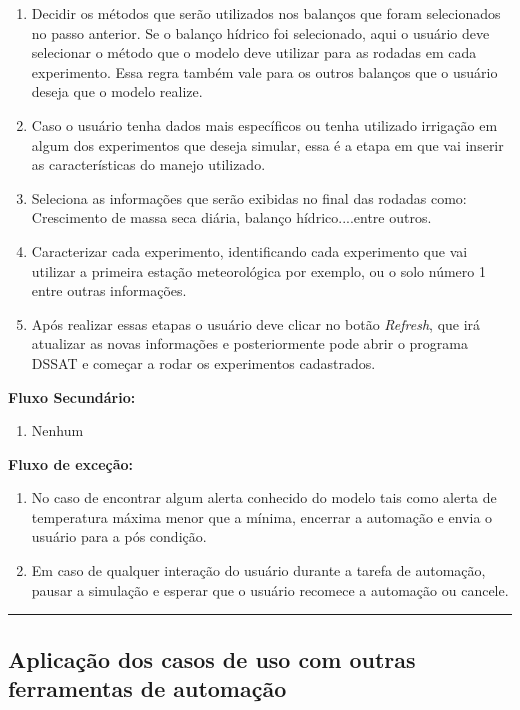 \documentclass[tg]{mdtufsm}
\begin{document}
\begin{enumerate}
		\item Decidir os métodos que serão utilizados nos balanços que foram selecionados no passo anterior. Se o balanço hídrico foi selecionado, aqui o usuário deve selecionar o método que o modelo deve utilizar para as rodadas em cada experimento. Essa regra também vale para os outros balanços que o usuário deseja que o modelo realize.
		\item Caso o usuário tenha dados mais específicos ou tenha utilizado irrigação em algum dos experimentos que deseja simular, essa é a etapa em que vai inserir as características do manejo utilizado.
		\item Seleciona as informações que serão exibidas no final das rodadas como: Crescimento de massa seca diária, balanço hídrico....entre outros.
		\item Caracterizar cada experimento, identificando cada experimento que vai utilizar a primeira estação meteorológica por exemplo, ou o solo número 1 entre outras informações.
		\item Após realizar essas etapas o usuário deve clicar no botão \emph{Refresh}, que irá atualizar as novas informações e posteriormente pode abrir o programa DSSAT e começar a rodar os experimentos cadastrados.
	\end{enumerate}

	{\bf Fluxo Secundário:}

	\begin{enumerate}
		\item Nenhum
	\end{enumerate}

	{\bf Fluxo de exceção:}

	\begin{enumerate}
		\item No caso de encontrar algum alerta conhecido do modelo tais como alerta de temperatura máxima menor que a mínima, encerrar a automação e envia o usuário para a pós condição.
		\item Em caso de qualquer interação do usuário durante a tarefa de automação, pausar a simulação e esperar que o usuário recomece a automação ou cancele.
	\end{enumerate}

	\bigskip \hrule \bigskip

	\subsection {Aplicação dos casos de uso com outras ferramentas de automação}
\end{document}
